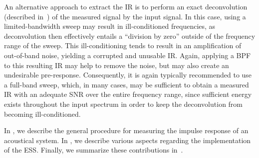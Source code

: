 An alternative approach to extract the IR is to perform an exact deconvolution
(described in~) of the measured signal by the input signal.
In this case, using a limited-bandwidth sweep may result in ill-conditioned frequencies,
as deconvolution then effectively entails a ``division by zero'' outside of the frequency range of the sweep.
This ill-conditioning tends to result in an amplification of out-of-band noise, yielding a corrupted and unusable IR.
Again, applying a BPF to this resulting IR may help to remove the noise, but may also create an undesirable pre-response.
Consequently, it is again typically recommended to use a full-band sweep, which, in many cases, may be sufficient to obtain a measured IR with an adequate SNR over the entire frequency range, since sufficient energy exists throughout the input spectrum in order to keep the deconvolution from becoming ill-conditioned.

In , we describe the general procedure for measuring the impulse response of an acoustical system.
In , we describe various aspects regarding the implementation of the ESS.
Finally, we summarize these contributions in~.